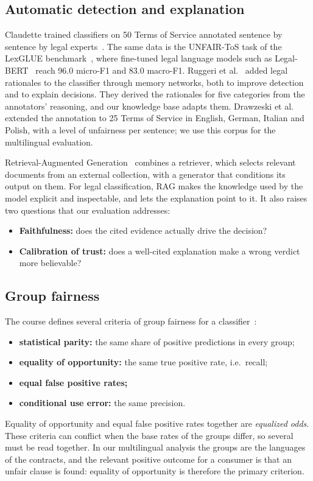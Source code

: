 \subsection{Automatic detection and explanation}

Claudette trained classifiers on 50 Terms of Service annotated sentence by sentence by legal experts~\citep{lippi2019claudette}. The same data is the UNFAIR-ToS task of the LexGLUE benchmark~\citep{chalkidis2022lexglue}, where fine-tuned legal language models such as Legal-BERT~\citep{chalkidis2020legalbert} reach 96.0 micro-F1 and 83.0 macro-F1. Ruggeri et al.~\citep{ruggeri2022memory} added legal rationales to the classifier through memory networks, both to improve detection and to explain decisions. They derived the rationales for five categories from the annotators' reasoning, and our knowledge base adapts them. Drawzeski et al.~\citep{drawzeski2021} extended the annotation to 25 Terms of Service in English, German, Italian and Polish, with a level of unfairness per sentence; we use this corpus for the multilingual evaluation.

Retrieval-Augmented Generation~\citep{lewis2020rag} combines a retriever, which selects relevant documents from an external collection, with a generator that conditions its output on them. For legal classification, RAG makes the knowledge used by the model explicit and inspectable, and lets the explanation point to it. It also raises two questions that our evaluation addresses:
\begin{itemize}
  \item \textbf{Faithfulness:} does the cited evidence actually drive the decision?
  \item \textbf{Calibration of trust:} does a well-cited explanation make a wrong verdict more believable?
\end{itemize}

\subsection{Group fairness}

The course defines several criteria of group fairness for a classifier~\citep{slides_fairness}:
\begin{itemize}
  \item \textbf{statistical parity:} the same share of positive predictions in every group;
  \item \textbf{equality of opportunity:} the same true positive rate, i.e.\ recall;
  \item \textbf{equal false positive rates;}
  \item \textbf{conditional use error:} the same precision.
\end{itemize}
Equality of opportunity and equal false positive rates together are \emph{equalized odds}. These criteria can conflict when the base rates of the groups differ, so several must be read together. In our multilingual analysis the groups are the languages of the contracts, and the relevant positive outcome for a consumer is that an unfair clause is found: equality of opportunity is therefore the primary criterion.
